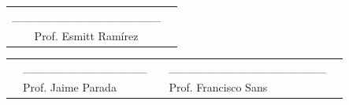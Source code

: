 						\begin{table}[h]
							\centering
								\begin{tabular}{c c}
                                    \_\_\_\_\_\_\_\_\_\_\_\_\_\_\_\_\_\_\\
							         Prof. Esmitt Ramírez
								\end{tabular}
						\end{table}
						
						\vspace{0.2cm}
				
						\begin{table}[h]
							\centering
								\begin{tabular}{ p{2 cm} p{4 cm} p{1 cm} p{4 cm} p{2 cm}}
                                & \_\_\_\_\_\_\_\_\_\_\_\_\_\_\_ & & \_\_\_\_\_\_\_\_\_\_\_\_\_\_\_\_\_\_\_ & \\
								&	     Prof. Jaime Parada     &      &             Prof. Francisco Sans & \\
								\end{tabular}
						\end{table}
						
					
\endgroup